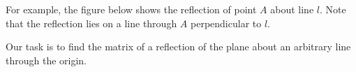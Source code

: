 \documentclass{ximera}
\begin{document}
For example, the figure below shows the reflection of point $A$ about line $l$.  Note that the reflection lies on a line through $A$ perpendicular to $l$.

\begin{center}
    \end{center}
 
Our task is to find the matrix of a reflection of the plane about an arbitrary line through the origin.  
  
\end{document}
